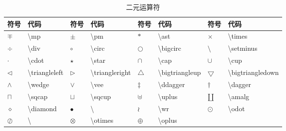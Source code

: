 \documentclass[UTF8,fontset=ubuntu]{ctexart}
\begin{document}
\begin{table}
\begin{tabular}{l l l l l l l l}
	\hline
	符号 & 代码 & 符号 & 代码 & 符号 & 代码 & 符号 & 代码\\
	\hline
	$\mp$ & \textbackslash mp & $\pm$ & \textbackslash pm & $\ast$ & \textbackslash ast & $\times$ & \textbackslash times\\
	$\div$ & \textbackslash div & $\circ$ & \textbackslash circ & $\bigcirc$ & \textbackslash bigcirc & $\setminus$ & \textbackslash setminus\\
	$\cdot$ & \textbackslash cdot & $\star$ & \textbackslash star & $\cap$ & \textbackslash cap & $\cup$ & \textbackslash cup\\
	$\triangleleft$ & \textbackslash triangleleft & $\triangleright$ & \textbackslash triangleright & $\bigtriangleup$ & \textbackslash bigtriangleup & $\bigtriangledown$ & \textbackslash bigtriangledown\\
	$\wedge$ & \textbackslash wedge & $\vee$ & \textbackslash vee & $\ddagger$ & \textbackslash ddagger & $\dagger$ & \textbackslash dagger\\
	$\sqcap$ & \textbackslash sqcap & $\sqcup$ & \textbackslash sqcup & $\uplus$ & \textbackslash uplus & $\amalg$ & \textbackslash amalg\\
	$\diamond$ & \textbackslash diamond & $\bullet$ & \textbackslash & $\wr$ & \textbackslash wr & $\odot$ & \textbackslash odot\\
	$\oslash$ & \textbackslash & $\otimes$ & \textbackslash otimes & $\oplus$ & \textbackslash oplus\\
	\hline
\end{tabular}
\caption{二元运算符}
\end{table}
\end{document}
